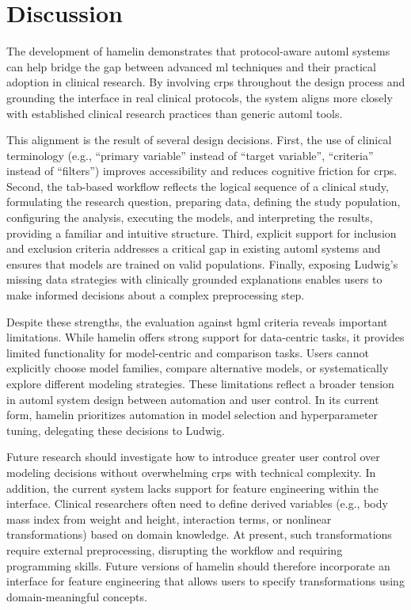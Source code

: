 \documentclass[conference,onecolumn]{IEEEtran}
\begin{document}
\section{Discussion}  
\label{sec:discussion}  
The development of \gls{hamelin} demonstrates that protocol-aware \gls{automl} systems can help bridge the gap between advanced \gls{ml} techniques and their practical adoption in clinical research. By involving \glspl{crp} throughout the design process and grounding the interface in real clinical protocols, the system aligns more closely with established clinical research practices than generic \gls{automl} tools.
  
This alignment is the result of several design decisions. First, the use of clinical terminology (e.g., ``primary variable'' instead of ``target variable'', ``criteria'' instead of ``filters'') improves accessibility and reduces cognitive friction for \glspl{crp}. Second, the tab-based workflow reflects the logical sequence of a clinical study, formulating the research question, preparing data, defining the study population, configuring the analysis, executing the models, and interpreting the results, providing a familiar and intuitive structure. Third, explicit support for inclusion and exclusion criteria addresses a critical gap in existing \gls{automl} systems and ensures that models are trained on valid populations. Finally, exposing Ludwig's missing data strategies with clinically grounded explanations enables users to make informed decisions about a complex preprocessing step.  
  
Despite these strengths, the evaluation against \gls{hgml} criteria reveals important limitations. While \gls{hamelin} offers strong support for data-centric tasks, it provides limited functionality for model-centric and comparison tasks. Users cannot explicitly choose model families, compare alternative models, or systematically explore different modeling strategies. These limitations reflect a broader tension in \gls{automl} system design between automation and user control. In its current form, \gls{hamelin} prioritizes automation in model selection and hyperparameter tuning, delegating these decisions to Ludwig.

Future research should investigate how to introduce greater user control over modeling decisions without overwhelming \glspl{crp} with technical complexity. In addition, the current system lacks support for feature engineering within the interface. Clinical researchers often need to define derived variables (e.g., body mass index from weight and height, interaction terms, or nonlinear transformations) based on domain knowledge. At present, such transformations require external preprocessing, disrupting the workflow and requiring programming skills. Future versions of \gls{hamelin} should therefore incorporate an interface for feature engineering that allows users to specify transformations using domain-meaningful concepts.
\end{document}
